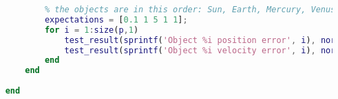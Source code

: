 \begin{lstlisting}[language=Matlab, caption={MATLAB Code that tests Solar System Function}]
            % mercury is harder to simulate because it moves the fastest
            % the objects are in this order: Sun, Earth, Mercury, Venus, Mars
            expectations = [0.1 1 5 1 1];
            for i = 1:size(p,1)
                test_result(sprintf('Object %i position error', i), norm(final_p(i,:) - correct_p(i,:))/norm(correct_p(i,:))*100, '%', @le, expectations(i));
                test_result(sprintf('Object %i velocity error', i), norm(final_v(i,:) - correct_v(i,:))/norm(correct_v(i,:))*100, '%', @le, expectations(i));
            end  
        end
    
    end
\end{lstlisting}
    